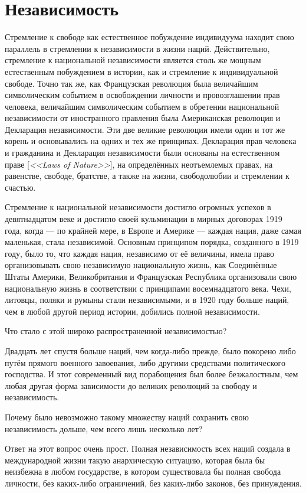 \chapter{Независимость}

Стремление к свободе как естественное побуждение индивидуума находит свою параллель в стремлении к независимости в жизни наций. Действительно, стремление к национальной независимости является столь же мощным естественным побуждением в истории, как и стремление к индивидуальной свободе. Точно так же, как Французская революция была величайшим символическим событием в освобождении личности и провозглашении прав человека, величайшим символическим событием в обретении национальной независимости от иностранного правления была Американская революция и Декларация независимости. Эти две великие революции имели один и тот же корень и основывались на одних и тех же принципах. Декларация прав человека и гражданина и Декларация независимости были основаны на естественном праве [\textit{<<Laws of Nature>>}], на определённых неотъемлемых правах, на равенстве, свободе, братстве, а также на жизни, свободолюбии и стремлении к счастью.
 
Стремление к национальной независимости достигло огромных успехов в девятнадцатом веке и достигло своей кульминации в мирных договорах 1919 года, когда — по крайней мере, в Европе и Америке — каждая нация, даже самая маленькая, стала независимой. Основным принципом порядка, созданного в 1919 году, было то, что каждая нация, независимо от её величины, имела право организовывать свою независимую национальную жизнь, как Соединённые Штаты Америки, Великобритания и Французская Республика организовали свою национальную жизнь в соответствии с принципами восемнадцатого века. Чехи, литовцы, поляки и румыны стали независимыми, и в 1920 году больше наций, чем в любой другой период истории, добились полной независимости.

Что стало с этой широко распространенной независимостью?

Двадцать лет спустя больше наций, чем когда-либо прежде, было покорено либо путём прямого военного завоевания, либо другими средствами политического господства. И этот современный вид порабощения был более безжалостным, чем любая другая форма зависимости до великих революций за свободу и независимость.

Почему было невозможно такому множеству наций сохранить свою независимость дольше, чем всего лишь несколько лет?

Ответ на этот вопрос очень прост. Полная независимость всех наций создала в международной жизни такую анархическую ситуацию, которая была бы неизбежна в любом государстве, в котором существовала бы полная свобода личности, без каких-либо ограничений, без каких-либо законов, без принуждения.

